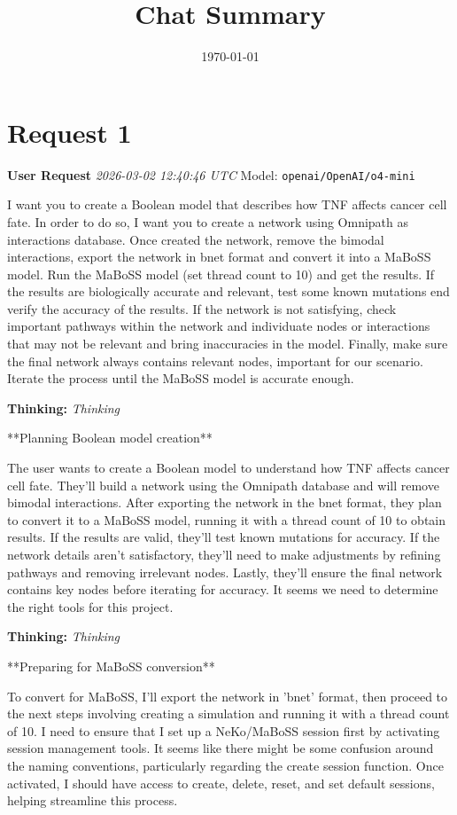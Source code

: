 \documentclass[11pt,a4paper]{article}
\title{Chat Summary}
\date{\today}
\begin{document}
\maketitle
\tableofcontents
\newpage

\section{Request 1}
\begin{userbox}
\textbf{User Request}
\quad \textit{2026-03-02 12:40:46 UTC}
\quad Model: \texttt{openai/OpenAI/o4-mini}

I want you to create a Boolean model that describes how TNF affects cancer cell fate. In order to do so, I want you to create a network using Omnipath as interactions database.
Once created the network, remove the bimodal interactions, export the network in bnet format and convert it into a MaBoSS model. Run the MaBoSS model (set thread count to 10) and get the results. If the results are biologically accurate and relevant, test some known mutations end verify the accuracy of the results. If the network is not satisfying, check important pathways within the network and individuate nodes or interactions that may not be relevant and bring inaccuracies in the model. Finally, make sure the final network always contains relevant nodes, important for our scenario.
Iterate the process until the MaBoSS model is accurate enough.

\end{userbox}
\begin{thinkbox}
\textbf{Thinking:} \textit{Thinking}

**Planning Boolean model creation**

The user wants to create a Boolean model to understand how TNF affects cancer cell fate. They'll build a network using the Omnipath database and will remove bimodal interactions. After exporting the network in the bnet format, they plan to convert it to a MaBoSS model, running it with a thread count of 10 to obtain results. If the results are valid, they'll test known mutations for accuracy. If the network details aren't satisfactory, they'll need to make adjustments by refining pathways and removing irrelevant nodes. Lastly, they'll ensure the final network contains key nodes before iterating for accuracy. It seems we need to determine the right tools for this project.

\end{thinkbox}
\begin{thinkbox}
\textbf{Thinking:} \textit{Thinking}

**Preparing for MaBoSS conversion**

To convert for MaBoSS, I’ll export the network in 'bnet' format, then proceed to the next steps involving creating a simulation and running it with a thread count of 10. I need to ensure that I set up a NeKo/MaBoSS session first by activating session management tools. It seems like there might be some confusion around the naming conventions, particularly regarding the create session function. Once activated, I should have access to create, delete, reset, and set default sessions, helping streamline this process.

\end{thinkbox}
\end{document}

